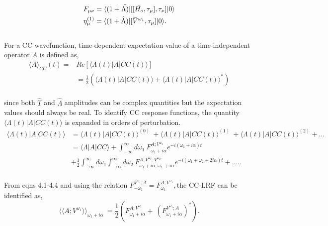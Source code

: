 \begin{equation}
\begin{split}
& F_{\mu\nu} = \bra{(1+ \hat{\Lambda)}}[[\bar{H_o}, \tau_\mu],\tau_\nu]\ket{0}\\
& \eta^{(1)}_{\mu} = \bra{(1+ \hat{\Lambda})}[\overbar{V}^{\omega_1}, \tau_\mu]\ket{0}.\\
\end{split}
\end{equation}
\\
For a CC wavefunction, time-dependent expectation value of a time-independent operator 
$A$ is defined as\cite{revisited},
\\
\begin{equation}
\begin{split}
{\langle A \rangle}_{CC} (t) = & Re [\langle \Lambda(t) | A | CC(t)\rangle ]\\
& = \frac{1}{2} (\langle \Lambda(t) | A | CC(t)\rangle  + {\langle \Lambda(t) | A | CC(t)\rangle}^{*})
\end{split}
\end{equation}
\\
since both $\hat{T}$ and $\hat{\Lambda}$ amplitudes can be complex quantities but 
the expectation values should always be real. To identify CC response functions,  
the quantity $\langle \Lambda(t) | A | CC(t)\rangle$ is expanded in orders of 
perturbation\cite{Revisited}.
\\
\begin{equation}
\begin{split}
\langle \Lambda(t) | A | CC(t) \rangle & = {\langle \Lambda(t) | A | CC(t) \rangle}^{(0)}\
 + {\langle \Lambda(t) | A | CC(t) \rangle}^{(1)} \
+ {\langle \Lambda(t) | A | CC(t) \rangle}^{(2)} + ... \\
& = \langle \Lambda | A | CC \rangle + \int_{-\infty}^{\infty}d\omega_1 \
F^{A;V^{\omega_1}}_{\omega_1 + i\alpha}e^{-i(\omega_1 + i\alpha)t} \\
& + \frac{1}{2} \int_{-\infty}^{\infty}d\omega_1\int_{-\infty}^{\infty}d\omega_2\
F^{A;V^{\omega_1};V^{\omega_2}}_{\omega_1 + i\alpha,\omega_2 \
+ i\alpha}e^{-i(\omega_1 + \omega_2 + 2i\alpha)t} + .....
\end{split}
\end{equation}
\\
From eqns 4.1-4.4 and using the relation $F^{V^{\omega_1};A}_{-\omega_1}=F^{A;V^{\omega_1}}_{\omega_1},$the CC-LRF can be identified as,
\\
\begin{equation}
{\langle\langle A;V^{\omega_1} \rangle\rangle}_{\omega_1 + i\alpha} \
= \frac{1}{2}( F^{A;V^{\omega_1}}_{\omega_1 + i\alpha} + \
(F^{V^{\omega_1};A}_{\omega_1 + i\alpha})^{*}).
\end{equation}
